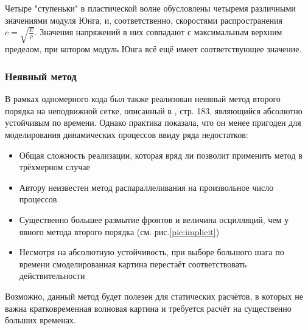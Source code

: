 Четыре "ступеньки" в пластической волне обусловлены четыремя различными значениями модуля Юнга, и, соответственно, скоростями распространения $c = \sqrt{\frac{E}{\rho}}$. Значения напряжений в них совпадают с максимальным верхним пределом, при котором модуль Юнга всё ещё имеет соответствующее значение.

\subsubsection{Неявный метод}
В рамках одномерного кода был также реализован неявный метод второго порядка на неподвижной сетке, описанный в \cite{kukudganov}, стр. 183, являющийся абсолютно устойчивым по времени. Однако практика показала, что он менее пригоден для моделирования динамических процессов ввиду ряда недостатков:
\begin{itemize}
\item Общая сложность реализации, которая вряд ли позволит применить метод в трёхмерном случае
\item Автору неизвестен метод распараллеливания на произвольное число процессов
\item Существенно большее размытие фронтов и величина осцилляций, чем у явного метода второго порядка (см. рис.\ref{pic:implicit})
\item Несмотря на абсолютную устойчивость, при выборе большого шага по времени смоделированная картина перестаёт соответствовать действительности
\end{itemize}
Возможно, данный метод будет полезен для статических расчётов, в которых не важна кратковременная волновая картина и требуется расчёт на существенно больших временах.

